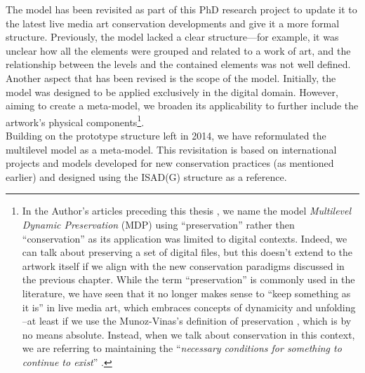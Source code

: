 The model has been revisited as part of this PhD research project to update it to the latest live media art conservation developments and give it a more formal structure. Previously, the model lacked a clear structure—for example, it was unclear how all the elements were grouped and related to a work of art, and the relationship between the levels and the contained elements was not well defined. Another aspect that has been revised is the scope of the model. Initially, the model was designed to be applied exclusively in the digital domain. However, aiming to create a meta-model, we broaden its applicability to further include the artwork's physical components\footnote{In the Author’s articles preceding this thesis \cite{fiordelmondo2023toward, fiordelmondo2023multilevel, fiordelmondo2024reactivating, fiordelmondo2024nime}, we name the model \textit{Multilevel Dynamic Preservation} (MDP) using ``preservation'' rather then ``conservation'' as its application was limited to digital contexts. Indeed, we can talk about preserving a set of digital files, but this doesn’t extend to the artwork itself if we align with the new conservation paradigms discussed in the previous chapter. While the term ``preservation'' is commonly used in the literature, we have seen that it no longer makes sense to ``keep something as it is'' in live media art, which embraces concepts of dynamicity and unfolding –at least if we use the Munoz-Vinas’s definition of preservation \cite{munoz2005contemporary}, which is by no means absolute. Instead, when we talk about conservation in this context, we are referring to maintaining the ``\textit{necessary conditions for something to continue to exist}'' \cite{castriota2019authenticity}.}.\\
Building on the prototype structure left in 2014, we have reformulated the multilevel model as a meta-model. This revisitation is based on international projects and models developed for new conservation practices (as mentioned earlier) and designed using the ISAD(G) structure as a reference.

